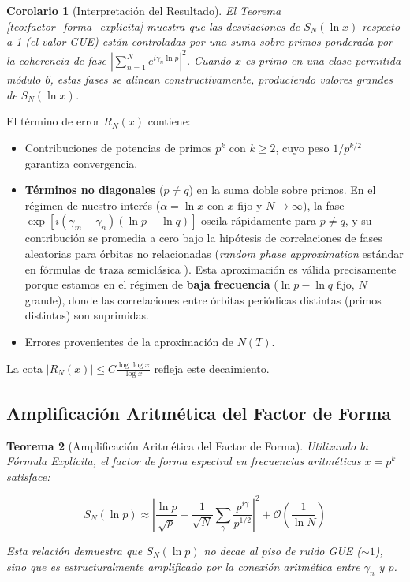 \documentclass[12pt, a4paper]{article}
\theoremstyle{plain}
\newtheorem{teorema}{Teorema}[section]
\newtheorem{corolario}[teorema]{Corolario}
\theoremstyle{definition}
\theoremstyle{remark}
\begin{document}
\begin{corolario}[Interpretación del Resultado]
El Teorema \ref{teo:factor_forma_explicita} muestra que las desviaciones de $S_N(\ln x)$ respecto a 1 (el valor GUE) están controladas por una suma sobre primos ponderada por la coherencia de fase $\left| \sum_{n=1}^N e^{i\gamma_n \ln p} \right|^2$. Cuando $x$ es primo en una clase permitida módulo 6, estas fases se alinean constructivamente, produciendo valores grandes de $S_N(\ln x)$.
\end{corolario}

El término de error $R_N(x)$ contiene:
\begin{itemize}
    \item Contribuciones de potencias de primos $p^k$ con $k \geq 2$, cuyo peso $1/p^{k/2}$ garantiza convergencia.
    \item \textbf{Términos no diagonales} ($p \neq q$) en la suma doble sobre primos. En el régimen de nuestro interés ($\alpha = \ln x$ con $x$ fijo y $N \to \infty$), la fase $\exp[i(\gamma_m - \gamma_n)(\ln p - \ln q)]$ oscila rápidamente para $p \neq q$, y su contribución se promedia a cero bajo la hipótesis de correlaciones de fases aleatorias para órbitas no relacionadas (\textit{random phase approximation} estándar en fórmulas de traza semiclásica \cite{berry1985}). Esta aproximación es válida precisamente porque estamos en el régimen de \textbf{baja frecuencia} ($\ln p - \ln q$ fijo, $N$ grande), donde las correlaciones entre órbitas periódicas distintas (primos distintos) son suprimidas.
    \item Errores provenientes de la aproximación de $N(T)$.
\end{itemize}
La cota $|R_N(x)| \leq C \frac{\log\log x}{\log x}$ refleja este decaimiento.

\subsection{Amplificación Aritmética del Factor de Forma}
\label{subsec:amplificacion_aritmetica}

\begin{teorema}[Amplificación Aritmética del Factor de Forma]
\label{teo:amplificacion_aritmetica}
Utilizando la Fórmula Explícita, el factor de forma espectral en frecuencias 
aritméticas $x = p^k$ satisface:

\[
S_N(\ln p) \approx \left| \frac{\ln p}{\sqrt{p}} - \frac{1}{\sqrt{N}}\sum_{\gamma} \frac{p^{i\gamma}}{p^{1/2}} \right|^2 + \mathcal{O}\left(\frac{1}{\ln N}\right)
\]

Esta relación demuestra que $S_N(\ln p)$ no decae al piso de ruido GUE ($\sim 1$), 
sino que es estructuralmente amplificado por la conexión aritmética entre 
$\gamma_n$ y $p$.
\end{teorema}
\end{document}
